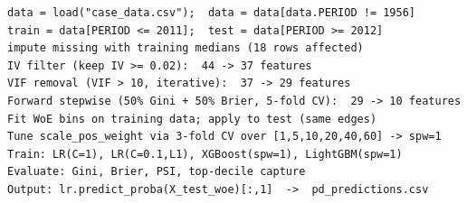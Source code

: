 \documentclass[a4paper,11pt]{article}
\begin{document}
\begin{verbatim}
data = load("case_data.csv");  data = data[data.PERIOD != 1956]
train = data[PERIOD <= 2011];  test = data[PERIOD >= 2012]
impute missing with training medians (18 rows affected)
IV filter (keep IV >= 0.02):  44 -> 37 features
VIF removal (VIF > 10, iterative):  37 -> 29 features
Forward stepwise (50% Gini + 50% Brier, 5-fold CV):  29 -> 10 features
Fit WoE bins on training data; apply to test (same edges)
Tune scale_pos_weight via 3-fold CV over [1,5,10,20,40,60] -> spw=1
Train: LR(C=1), LR(C=0.1,L1), XGBoost(spw=1), LightGBM(spw=1)
Evaluate: Gini, Brier, PSI, top-decile capture
Output: lr.predict_proba(X_test_woe)[:,1]  ->  pd_predictions.csv
\end{verbatim}
\end{document}
